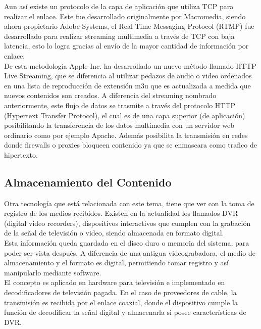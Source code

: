 Aun así existe un protocolo de la capa de aplicación que utiliza TCP para realizar el enlace. Este fue desarrollado originalmente por Macromedia, siendo ahora propietario Adobe Systems, el Real Time Messaging Protocol (RTMP) fue desarrollado para realizar streaming multimedia a través de TCP con baja latencia, esto lo logra gracias al envío de la mayor cantidad de información por enlace. \\
	
	De esta metodología Apple Inc. ha desarrollado un nuevo método llamado HTTP Live Streaming, que se diferencia al utilizar pedazos de audio o video  ordenados en una lista de reproducción de extensión m3u que es actualizada a medida que nuevos contenidos son creados. A diferencia del streaming nombrado anteriormente, este flujo de datos se trasmite a través del protocolo HTTP (Hypertext Transfer Protocol), el cual es de una capa superior (de aplicación) posibilitando la transferencia de los datos multimedia con un servidor web ordinario como por ejemplo Apache. Además posibilita la transmisión en redes donde firewalls o proxies bloqueen contenido ya que se enmascara como trafico de hipertexto. \\


\subsection{Almacenamiento del Contenido}

Otra tecnología que está relacionada con este tema, tiene que ver con la toma de registro de los medios recibidos. Existen en la actualidad los llamados DVR (digital video recorders), dispositivos interactivos que cumplen con la grabación de la señal de televisión o video, siendo almacenada en formato digital.\\

 Esta información queda guardada en el disco duro o memoria del sistema, para poder ser vista después. A diferencia de una antigua videograbadora, el medio de almacenamiento y el formato es digital, permitiendo tomar registro y así manipularlo mediante software.\\
 
	El concepto es aplicado en hardware para televisión e implementado en decodificadores de televisión pagada. En el caso de proveedores de cable, la transmisión es recibida por el enlace coaxial, donde el dispositivo cumple la función de decodificar la señal digital y almacenarla si posee características de DVR.\\

